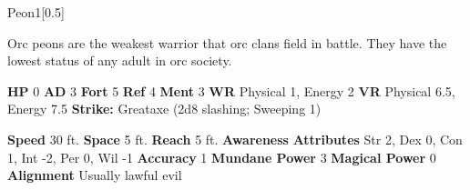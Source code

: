   \begin{monsubsection}{Peon}{1}[0.5]
    \vspace{-1em}\vspace{-1em}
    \vspace{0em}

    
          Orc peons are the weakest warrior that orc clans field in battle.
          They have the lowest status of any adult in orc society.
        

    \begin{spellcontent}
      \begin{spelltargetinginfo}
        \pari \textbf{HP} 0 \monsep
          \textbf{AD} 3 \monsep
          \textbf{Fort} 5 \monsep
          \textbf{Ref} 4 \monsep
          \textbf{Ment} 3
        \pari \textbf{WR} Physical 1, Energy 2 \monsep
        \textbf{VR} Physical 6.5, Energy 7.5
        \pari \textbf{Strike:}
            Greataxe  (2d8 slashing; Sweeping 1)
      \end{spelltargetinginfo}
    \end{spellcontent}
    \begin{monsterfooter}
      \pari \textbf{Speed} 30 ft. \monsep
        \textbf{Space} 5 ft. \monsep
        \textbf{Reach} 5 ft.
      \pari \textbf{Awareness} 
      \pari \textbf{Attributes}
        Str 2, Dex 0,
        Con 1, Int -2,
        Per 0, Wil -1
      \pari \textbf{Accuracy} 1 \monsep
        \textbf{Mundane Power} 3 \monsep
      \textbf{Magical Power} 0
      \pari \textbf{Alignment} Usually lawful evil
    \end{monsterfooter}
  \end{monsubsection}
  
  

